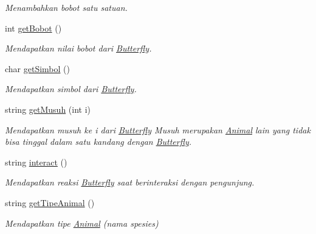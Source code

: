 \begin{DoxyCompactItemize}
\begin{DoxyCompactList}\small\item\em Menambahkan bobot satu satuan. \end{DoxyCompactList}\item 
int \hyperlink{classButterfly_ac802d3934d533606ee8c4229265d0be1}{get\-Bobot} ()
\begin{DoxyCompactList}\small\item\em Mendapatkan nilai bobot dari \hyperlink{classButterfly}{Butterfly}. \end{DoxyCompactList}\item 
char \hyperlink{classButterfly_a15c3ae75ea826f50d25bb347abe4a4c4}{get\-Simbol} ()
\begin{DoxyCompactList}\small\item\em Mendapatkan simbol dari \hyperlink{classButterfly}{Butterfly}. \end{DoxyCompactList}\item 
string \hyperlink{classButterfly_a42116546aa9eb5dd2cac11761cfe749e}{get\-Musuh} (int i)
\begin{DoxyCompactList}\small\item\em Mendapatkan musuh ke i dari \hyperlink{classButterfly}{Butterfly} Musuh merupakan \hyperlink{classAnimal}{Animal} lain yang tidak bisa tinggal dalam satu kandang dengan \hyperlink{classButterfly}{Butterfly}. \end{DoxyCompactList}\item 
string \hyperlink{classButterfly_a64595ce265c79591af2095880bca70f1}{interact} ()
\begin{DoxyCompactList}\small\item\em Mendapatkan reaksi \hyperlink{classButterfly}{Butterfly} saat berinteraksi dengan pengunjung. \end{DoxyCompactList}\item 
string \hyperlink{classButterfly_a7a11185ad98c664b3d3f052336afec0e}{get\-Tipe\-Animal} ()
\begin{DoxyCompactList}\small\item\em Mendapatkan tipe \hyperlink{classAnimal}{Animal} (nama spesies) \end{DoxyCompactList}\end{DoxyCompactItemize}
